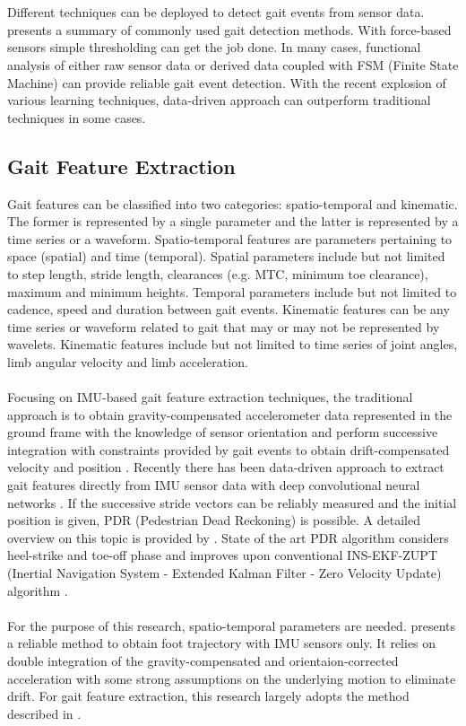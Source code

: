 \\\\
Different techniques can be deployed to detect gait events from sensor data.  \cite{Rue10} presents a summary of commonly used gait detection methods. With force-based sensors simple thresholding can get the job done. In many cases, functional analysis of either raw sensor data or derived data coupled with FSM (Finite State Machine) can provide reliable gait event detection. With the recent explosion of various learning techniques, data-driven approach  can outperform traditional techniques in some cases.


\subsection{Gait Feature Extraction}
Gait features can be classified into two categories: spatio-temporal and kinematic. The former is represented by a single parameter and the latter is represented by a time series or a waveform. Spatio-temporal features are parameters pertaining to space (spatial) and time (temporal). Spatial parameters include but not limited to step length, stride length, clearances (e.g. MTC, minimum toe clearance), maximum and minimum heights. Temporal parameters include but not limited to cadence, speed and duration between gait events. Kinematic features can be any time series or waveform related to gait that may or may not be represented by wavelets. Kinematic features include but not limited to time series of joint angles, limb angular velocity and limb acceleration.
\\\\
Focusing on IMU-based gait feature extraction techniques, the traditional approach is to obtain gravity-compensated accelerometer data represented in the ground frame with the knowledge of sensor orientation and perform successive integration with constraints provided by gait events to obtain drift-compensated velocity and position \citep{Ram15, Kit16}. Recently there has been data-driven approach to extract gait features directly from IMU sensor data with deep convolutional neural networks \citep{Han17}. If the successive stride vectors can be reliably measured and the initial position is given, PDR (Pedestrian Dead Reckoning) is possible. A detailed overview on this topic is provided by \cite{Woo10}. State of the art PDR algorithm considers heel-strike and toe-off phase and improves upon conventional INS-EKF-ZUPT (Inertial Navigation System - Extended Kalman Filter - Zero Velocity Update) algorithm \citep{Ju16}.
\\\\
For the purpose of this research, spatio-temporal parameters are needed. \cite{Kit16} presents a reliable method to obtain foot trajectory with IMU sensors only. It relies on double integration of the gravity-compensated and orientaion-corrected acceleration with some strong assumptions on the underlying motion to eliminate drift. For gait feature extraction, this research largely adopts the method described in \cite{Kit16}. 

